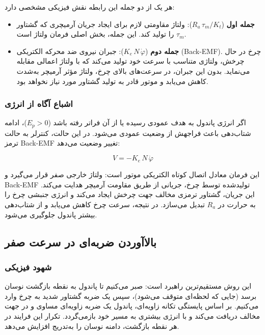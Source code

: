 هر یک از دو جمله این رابطه نقش فیزیکی مشخصی دارد:

\begin{itemize}
    \item \textbf{جمله اول} ($R_a\, \tau_m / K_t$): ولتاژ مقاومتی لازم برای ایجاد جریان آرمیچری که گشتاور $\tau_m$ را تولید کند. این جمله، بخش اصلی فرمان ولتاژ است.
    \item \textbf{جمله دوم} ($K_e\, N\, \dot\varphi$): جبران نیروی ضد محرکه الکتریکی (Back-EMF). چرخ در حال چرخش، ولتاژی متناسب با سرعت خود تولید می‌کند که با ولتاژ اعمالی مقابله می‌نماید. بدون این جبران، در سرعت‌های بالای چرخ، ولتاژ مؤثر آرمیچر به‌شدت کاهش می‌یابد و موتور قادر به تولید گشتاور مورد نیاز نخواهد بود.
\end{itemize}

\subsubsection{اشباع آگاه از انرژی}

اگر انرژی پاندول به هدف عمودی رسیده یا از آن فراتر رفته باشد ($E_p > 0$)، ادامه شتاب‌دهی باعث فراجهش از وضعیت عمودی می‌شود. در این حالت، کنترلر به حالت ترمز Back-EMF تغییر وضعیت می‌دهد:

\begin{equation}
    V = -K_e\, N\, \dot\varphi
\end{equation}

این فرمان معادل اتصال کوتاه الکتریکی موتور است: ولتاژ خارجی صفر قرار می‌گیرد و Back-EMF تولیدشده توسط چرخ، جریانی از طریق مقاومت آرمیچر هدایت می‌کند. این جریان، گشتاور ترمزی مخالف جهت چرخش ایجاد می‌کند و انرژی جنبشی چرخ را به حرارت در $R_a$ تبدیل می‌سازد. در نتیجه، سرعت چرخ کاهش می‌یابد و از شتاب‌دهی بیشتر پاندول جلوگیری می‌شود.

\subsection{بالاآوردن ضربه‌ای در سرعت صفر}

\subsubsection{شهود فیزیکی}

این روش مستقیم‌ترین راهبرد است: صبر می‌کنیم تا پاندول به نقطه بازگشت نوسان برسد (جایی که لحظه‌ای متوقف می‌شود)، سپس یک ضربه گشتاور شدید به چرخ وارد می‌کنیم. بر اساس پایستگی تکانه زاویه‌ای، پاندول یک ضربه زاویه‌ای مساوی و در جهت مخالف دریافت می‌کند و با انرژی بیشتری به مسیر خود بازمی‌گردد. تکرار این فرایند در هر نقطه بازگشت، دامنه نوسان را به‌تدریج افزایش می‌دهد.

